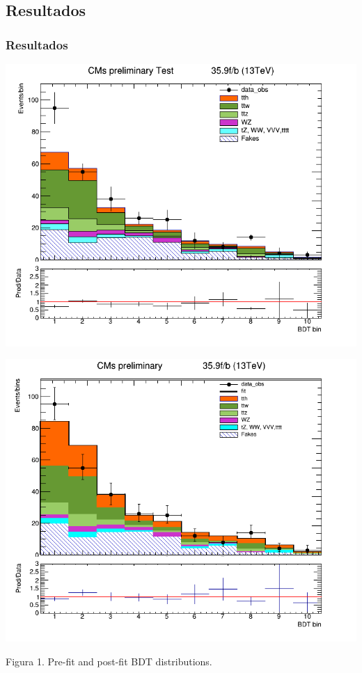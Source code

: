 \documentclass[11pt]{beamer}
\begin{document}
\begin{frame}
\section{Resultados}
\frametitle{Resultados}
\begin{center}
	\begin{minipage}{0.5\textwidth}
		\centering
		\includegraphics[width=.95\linewidth]{hist-function.png}\label{Fig:Data1}
	\end{minipage}\hfill
	\begin{minipage}{0.5\textwidth}
		\centering
		\includegraphics[width=.95\linewidth]{histofit-constrain.png}\label{Fig:Data2}
	\end{minipage}
	\begin{footnotesize}
		Figura 1. Pre-fit and post-fit BDT distributions.
	\end{footnotesize}
\end{center}
\end{frame}
\end{document}
